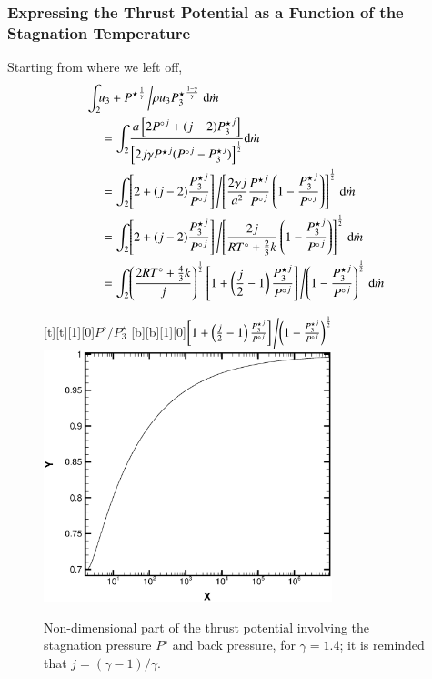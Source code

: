 \documentclass{warpdoc}
\numberwithin{equation}{section}
\newcommand{\alb}{\vspace{0.2cm}\\} %
\newcommand{\mfd}{\displaystyle}
\newcommand{\ordi}{{\rm d}}
\newcommand{\mdot}{\dot{m}}
\begin{document}
\subsubsection{Expressing the Thrust Potential as a Function of the Stagnation
               Temperature}

Starting from where we left off,
%
\begin{align*}
\mfd\int_2& \! u_{3}
 + {P^\star}^{\frac{1}{\gamma}}  \left/ \rho u_{3}{P_3^\star}^{\frac{1-\gamma}{\gamma}}
    \right.\ordi \mdot\alb
   &=\mfd\int_2 \!
  \frac{
   a \left[ 2 {P^\circ}^j + (j-2) {P_3^\star}^j \right]
  }{
    \left[2 j \gamma {P^\star}^j ( {P^\circ}^j-{P_3^\star}^j) \right]^\frac{1}{2}
  }
   \ordi \mdot\alb
   &=\mfd\int_2 \!
    \left[ 2+ (j-2) \frac{{P_3^\star}^j}{{P^\circ}^j} \right]
  \left/
    \left[\frac{2\gamma j}{a^2} \frac{{P^\star}^j}{{P^\circ}^j} \left( 1-\frac{{P_3^\star}^j}{{P^\circ}^j}\right) \right]^\frac{1}{2}
  \right.
   \ordi \mdot\alb
   &=\mfd\int_2 \!
    \left[ 2+ (j-2) \frac{{P_3^\star}^j}{{P^\circ}^j} \right]
  \left/
    \left[\frac{2 j}{R T^\circ + \frac{2}{3} k} \left( 1-\frac{{P_3^\star}^j}{{P^\circ}^j}\right) \right]^\frac{1}{2}
  \right.
   \ordi \mdot\alb
  &=\mfd\int_2 \!
    \left(\frac{2 R T^\circ + \frac{4}{3} k}{j}\right)^\frac{1}{2}
    \left[ 1+ \left(\frac{j}{2}-1\right) \frac{{P_3^\star}^j}{{P^\circ}^j} \right]
  \left/
    \left( 1-\frac{{P_3^\star}^j}{{P^\circ}^j}\right)^\frac{1}{2}
  \right.
   \ordi \mdot
\end{align*}
%
%
\begin{figure}[ht]
 \begin{center}
   [t][t][1][0]{$P^\circ/P_3^\star$}
   [b][b][1][0]{$\left[ 1+ \left(\frac{j}{2}-1\right) \frac{{P_3^\star}^j}{{P^\circ}^j} \right]
  \left/
    \left( 1-\frac{{P_3^\star}^j}{{P^\circ}^j}\right)^\frac{1}{2}
  \right.$}
   \includegraphics[width=3.3in]{pstag_over_p3.eps}
   \caption{Non-dimensional part of the thrust potential involving the
            stagnation pressure $P^\circ$ and back pressure, for
            $\gamma=1.4$; it is reminded that $j=(\gamma-1)/\gamma$.}
 \end{center}
\end{figure}
\end{document}
